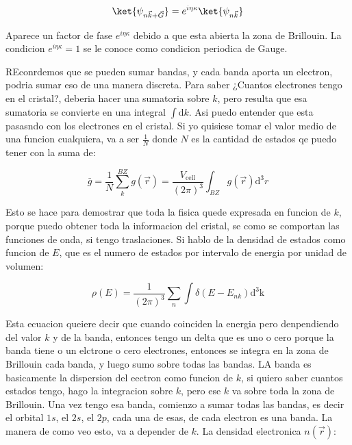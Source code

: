 \documentclass[11pt,fleqn]{book}
\begin{document}
\begin{equation}
    \ket{\psi_{n\vec{k}+\vec{G}}}=e^{i\eta\kappa}\ket{\psi_{n\vec{k}}}
\end{equation}

Aparece un factor de fase $e^{i\eta\kappa}$ debido a que esta abierta la zona de Brillouin. La condicion $e^{i\eta\kappa}=1$ se le conoce como condicion periodica de Gauge. 


REconrdemos que se pueden sumar bandas, y cada banda aporta un electron, podria sumar eso de una manera discreta. Para saber ¿Cuantos electrones tengo en el cristal?, deberia hacer una sumatoria sobre $k$,  pero  resulta que esa sumatoria se convierte en una integral $\int\mathrm{d}k$. Asi puedo entender que esta pasasndo con los electrones en el cristal. Si yo quisiese tomar el valor medio de una funcion cualquiera, va a ser $\frac{1}{N}$ donde $N$ es la cantidad de estados qe puedo tener con la suma de:

\begin{equation}
    \bar{g}=\frac{1}{N}\sum_{k}^{BZ}g(\vec{r})=\frac{V_{\text{cell}}}{(2\pi)^{3}}\int_{BZ}g(\vec{r})\mathrm{d}^{3}r
\end{equation}

Esto se hace para demostrar que toda la fisica quede expresada en funcion de $k$, porque puedo obtener toda la informacion del cristal, se como se comportan las funciones de onda, si tengo traslaciones. Si hablo de la densidad de estados como funcion de $E$, que es el numero de estados por intervalo de energia por unidad de volumen:

\begin{equation}
    \rho(E)=\frac{1}{(2\pi)^{3}}\sum_{n}\int\delta(E-E_{nk})\mathrm{d^{3}k}
\end{equation}

Esta ecuacion queiere decir que cuando coinciden la energia pero denpendiendo del valor $k$ y de la banda, entonces tengo un delta que es uno o cero porque la banda tiene o un elctrone o cero electrones, entonces se integra en la zona de Brillouin cada banda, y luego sumo sobre todas las bandas. LA banda es basicamente la dispersion del eectron como funcion de $k$, si quiero saber cuantos estados tengo, hago la integracion sobre $k$, pero ese $k$ va sobre toda la zona de Brillouin. Una vez tengo esa banda, comienzo a sumar todas las bandas, es decir el orbital $1s$, el $2s$, el $2p$, cada una de esas, de cada electron es una banda. La manera de como veo esto, va a depender de $k$. La densidad electronica $n(\vec{r})$:
\end{document}
